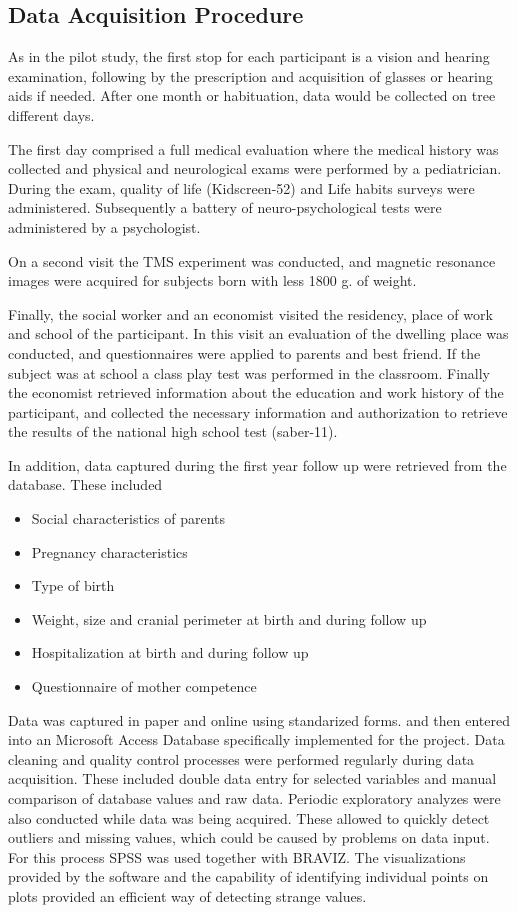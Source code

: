 \subsection{Data Acquisition Procedure}
 
As in the pilot study, the first stop for each participant is a vision and hearing examination, following by the prescription and acquisition of glasses or hearing aids if needed. After one month or habituation, data would be collected on tree different days.

The first day comprised a full medical evaluation where the medical history was collected and physical and neurological exams were performed by a pediatrician. During the exam, quality of life (Kidscreen-52) and Life habits surveys were administered. Subsequently a battery of neuro-psychological tests were administered by a psychologist. 

On a second visit the TMS experiment was conducted, and magnetic resonance images were acquired for subjects born with less 1800 g. of weight. 

Finally, the social worker and an economist visited the residency, place of work and school of the participant. In this visit an evaluation of the dwelling place was conducted, and questionnaires were applied to parents and best friend. If the subject was at school a class play test was performed in the classroom. Finally the economist retrieved information about the education and work history of the participant, and collected the necessary information and authorization to retrieve the results of the national high school test (saber-11).

In addition, data captured during the first year follow up were retrieved from the database. These included

\begin{itemize}
\item Social characteristics of parents
\item Pregnancy characteristics 
\item Type of birth
\item Weight, size and cranial perimeter at birth and during follow up
\item Hospitalization at birth and during follow up
\item Questionnaire of mother competence
\end{itemize}

Data was captured in paper and online using standarized forms. and then entered into an Microsoft Access Database specifically implemented for the project. Data cleaning and quality control processes were performed regularly during data acquisition. These included double data entry for selected variables and manual comparison of database values and raw data. Periodic exploratory analyzes were also conducted while data was being acquired. These allowed to quickly detect outliers and missing values, which could be caused by problems on data input. For this process SPSS was used together with BRAVIZ. The visualizations provided by the software and the capability of identifying individual points on plots provided an efficient way of detecting strange values.

